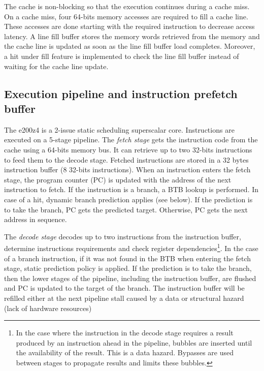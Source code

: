 
The cache is non-blocking so that the execution continues during a cache miss. 
On a cache miss, four 64-bits memory accesses %
 are required to fill a cache line. 
These accesses are done starting with the required instruction to decrease access latency. 
A line fill buffer stores the memory words retrieved from the memory and the cache line is updated as soon as the line fill buffer load completes. 
Moreover, a hit under fill feature is implemented to check the line fill buffer instead of waiting for the cache line update.



\subsection{Execution pipeline and instruction prefetch buffer}
\label{sec:architecture:pipeline}

The e200z4 is a 2-issue static scheduling superscalar core. 
Instructions are executed on a 5-stage pipeline. 
The \emph{fetch stage} gets the instruction code from the cache using a 64-bits memory bus.
It can retrieve up to two 32-bits instructions to feed them to the decode stage.
Fetched instructions are stored in a 32 bytes instruction buffer (8 32-bits instructions). 
When an instruction enters the fetch stage, the program counter (PC) is updated with the address of the next instruction to fetch.
If the instruction is a branch, a BTB lookup is performed. 
In case of a hit, dynamic branch prediction applies (see below).
If the prediction is to take the branch, PC gets the predicted target.
Otherwise, PC gets the next address in sequence.


The \emph{decode stage} decodes up to two instructions from the instruction buffer, determine instructions requirements and check register dependencies\footnote{In the case where the instruction in the decode stage requires a result produced by an instruction ahead in the pipeline, bubbles are inserted until the availability of the result. This is a data hazard. Bypasses are used between stages to propagate results and limits these bubbles.}. 
In the case of a branch instruction, if it was not found in the BTB when entering the fetch stage, static prediction policy is applied.
If the prediction is to take the branch, then the lower stages of the pipeline, including the instruction buffer, are flushed and PC is updated to the target of the branch.
The instruction buffer will be refilled either at the next pipeline stall caused by a data or structural hazard (lack of hardware resources)

